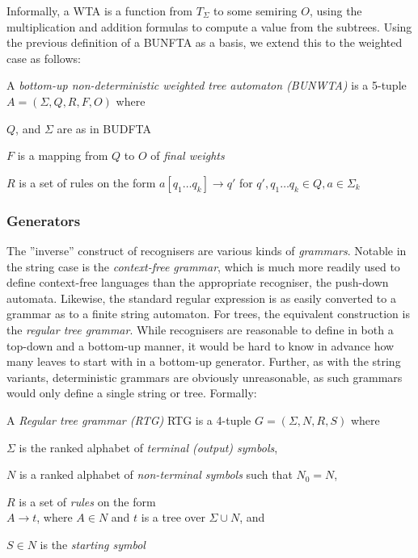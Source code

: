 Informally, a WTA is a function from $T_\Sigma$ to some semiring $O$, using
the multiplication and addition formulas to compute a value from the
subtrees. Using the previous definition of a BUNFTA as a basis, we extend
this to the weighted case as follows:

A \emph{bottom-up non-deterministic weighted tree automaton (BUNWTA)} is a
5-tuple $A = (\Sigma, Q, R, F, O)$ where
\begin{compactitem}
\item $Q$, and $\Sigma$ are as in BUDFTA
\item $F$ is a mapping from $Q$ to $O$ of \emph{final weights}
\item $R$ is a set of rules on the form
$a[q_1 \ldots q_k] \rightarrow q'$ for $q',q_1 \ldots q_k \in Q, a \in
\Sigma_k$
\end{compactitem}


\subsubsection{Generators}

The ''inverse'' construct of recognisers are various kinds of
\emph{grammars}. Notable in the string case is the \emph{context-free
  grammar}, which is much more readily used to define context-free
languages than the appropriate recogniser, the push-down automata.
Likewise, the standard regular expression is as easily converted to a
grammar as to a finite string automaton. For trees, the equivalent
construction is the \emph{regular tree grammar}. While recognisers are
reasonable to define in both a top-down and a bottom-up manner, it would be
hard to know in advance how many leaves to start with in a bottom-up
generator. Further, as with the string variants, deterministic grammars are
obviously unreasonable, as such grammars would only define a single string
or tree. Formally:

A \emph{Regular tree grammar (RTG)} RTG is a 4-tuple $G = (\Sigma, N, R, S)$ where
\begin{compactitem}
\item $\Sigma$ is the ranked alphabet of \emph{terminal (output) symbols},
\item $N$ is a ranked alphabet of \emph{non-terminal symbols} such that $N_0 = N$, 
\item $R$ is a set of \emph{rules} on the form\\
    $A \rightarrow t$, where $A \in N$ and $t$ is a tree over $\Sigma \cup N$, and
\item $S \in N$ is the \emph{starting symbol}
\end{compactitem}

